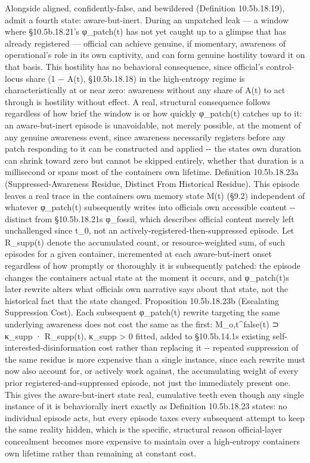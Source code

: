 \documentclass[
]{article}
\begin{document}
Alongside aligned, confidently-false, and bewildered (Definition
10.5b.18.19), admit a fourth state: aware-but-inert. During an unpatched
leak --- a window where §10.5b.18.21's φ\_patch(t) has not yet caught up
to a glimpse that has already registered --- official can achieve
genuine, if momentary, awareness of operational's role in its own
captivity, and can form genuine hostility toward it on that basis. This
hostility has no behavioral consequence, since official's control-locus
share (1 − A(t), §10.5b.18.18) in the high-entropy regime is
characteristically at or near zero: awareness without any share of A(t)
to act through is hostility without effect. A real, structural
consequence follows regardless of how brief the window is or how quickly
φ\_patch(t) catches up to it: an aware-but-inert episode is unavoidable,
not merely possible, at the moment of any genuine awareness event, since
awareness necessarily registers before any patch responding to it can be
constructed and applied -\/- the states own duration can shrink toward
zero but cannot be skipped entirely, whether that duration is a
millisecond or spans most of the containers own lifetime. Definition
10.5b.18.23a (Suppressed-Awareness Residue, Distinct From Historical
Residue). This episode leaves a real trace in the containers own memory
state M(t) (§9.2) independent of whatever φ\_patch(t) subsequently
writes into officials own accessible content -\/- distinct from
§10.5b.18.21s φ\_fossil, which describes official content merely left
unchallenged since t\_0, not an actively-registered-then-suppressed
episode. Let R\_supp(t) denote the accumulated count, or
resource-weighted sum, of such episodes for a given container,
incremented at each aware-but-inert onset regardless of how promptly or
thoroughly it is subsequently patched: the episode changes the
containers actual state at the moment it occurs, and φ\_patch(t)s later
rewrite alters what officials own narrative says about that state, not
the historical fact that the state changed. Proposition 10.5b.18.23b
(Escalating Suppression Cost). Each subsequent φ\_patch(t) rewrite
targeting the same underlying awareness does not cost the same as the
first: M\_o,t\^{}false(t) ⊃ κ\_supp · R\_supp(t), κ\_supp \textgreater{}
0 fitted, added to §10.5b.14.1s existing self-interested-disinformation
cost rather than replacing it -\/- repeated suppression of the same
residue is more expensive than a single instance, since each rewrite
must now also account for, or actively work against, the accumulating
weight of every prior registered-and-suppressed episode, not just the
immediately present one. This gives the aware-but-inert state real,
cumulative teeth even though any single instance of it is behaviorally
inert exactly as Definition 10.5b.18.23 states: no individual episode
acts, but every episode taxes every subsequent attempt to keep the same
reality hidden, which is the specific, structural reason official-layer
concealment becomes more expensive to maintain over a high-entropy
containers own lifetime rather than remaining at constant cost.
\end{document}
